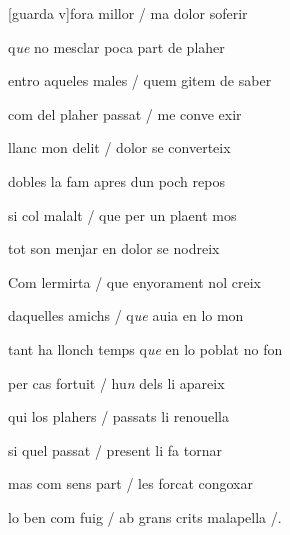 \begin{estrofa}

 [guarda v]fora millor / ma dolor soferir

 q\textit{ue} no mesclar poca part de plaher

 entro aqueles males / quem gitem de saber

 com del plaher passat / me conve exir

 llanc mon delit / dolor se converteix

 dobles la fam apres dun poch repos

 si col malalt / que per un plaent mos

 tot son menjar en dolor se nodreix

\end{estrofa}



\begin{estrofa}

 Com lermirta / que enyorament nol creix

 daquelles amichs / q\textit{ue} auia en lo mon

 tant ha llonch temps q\textit{ue} en lo poblat no fon

 per cas fortuit / hu\textit{n} dels li apareix

 qui los plahers / passats li renouella

 si quel passat / present li fa tornar

 mas com sens part / les forcat congoxar

 lo ben com fuig / ab grans crits malapella /.

\end{estrofa}



